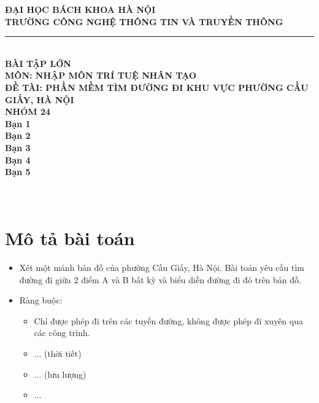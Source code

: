 \documentclass[12pt]{article}
\begin{document}
\begin{center}
\vspace*{-4cm}
\textbf{\normalsize ĐẠI HỌC BÁCH KHOA HÀ NỘI}\\
\textbf{\normalsize TRƯỜNG CÔNG NGHỆ THÔNG TIN VÀ TRUYỀN THÔNG}
\rule{0.5\textwidth}{0.4pt}\\
\vspace*{3cm}
\textbf{\Huge BÀI TẬP LỚN}\\
\vspace*{0.5cm}
\textbf{\Large MÔN: NHẬP MÔN TRÍ TUỆ NHÂN TẠO}\\
\vspace*{3cm}
\textbf{\Large ĐỀ TÀI: PHẦN MỀM TÌM ĐƯỜNG ĐI KHU VỰC PHƯỜNG CẦU GIẤY, HÀ NỘI}\\
\vspace*{2cm}
\textbf{\large NHÓM 24}\\
\vspace*{0.5cm}
\textbf{\normalsize Bạn 1}\\
\textbf{\normalsize Bạn 2}\\
\textbf{\normalsize Bạn 3}\\
\textbf{\normalsize Bạn 4}\\
\textbf{\normalsize Bạn 5}\\
\vspace*{2cm}
\\
\\
\end{center}

\newpage

\tableofcontents

\newpage
\section{Mô tả bài toán}
\begin{itemize}
    \item Xét một mảnh bản đồ của phường Cầu Giấy, Hà Nội. Bài toán yêu cầu tìm đường đi giữa 2 điểm A và B bất kỳ và biểu diễn đường đi đó trên bản đồ.
    \item Ràng buộc: 
    \begin{itemize}
    \item Chỉ được phép đi trên các tuyến đường, không được phép đi xuyên qua các công trình.
    \item ... (thời tiết)
    \item ... (lưu lượng)
    \item ...
    \end{itemize}
\end{itemize}
\end{document}
